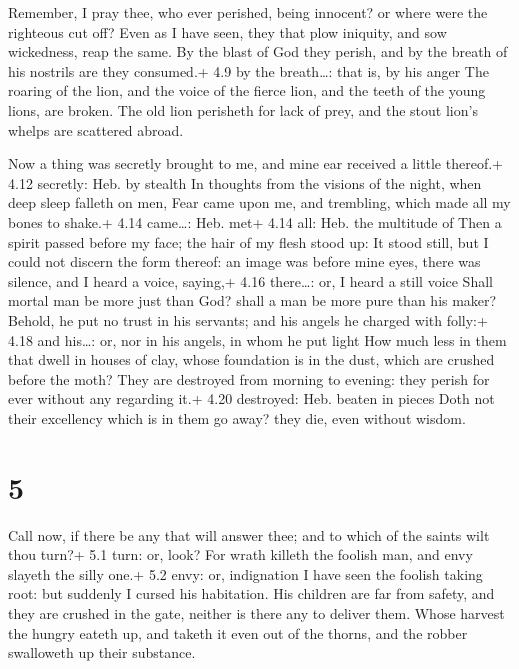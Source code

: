  Remember, I pray thee, who ever perished, being innocent?
or where were the righteous cut off?  Even as I have seen,
they that plow iniquity, and sow wickedness, reap the same. 
By the blast of God they perish, and by the breath of his nostrils are
they consumed.+ 4.9 by the breath\ldots: that is, by his anger
 The roaring of the lion, and the voice of the fierce lion,
and the teeth of the young lions, are broken.  The old lion
perisheth for lack of prey, and the stout lion's whelps are scattered
abroad.

 Now a thing was secretly brought to me, and mine ear
received a little thereof.+ 4.12 secretly: Heb. by stealth 
In thoughts from the visions of the night, when deep sleep falleth on
men,  Fear came upon me, and trembling, which made all my
bones to shake.+ 4.14 came\ldots: Heb. met+ 4.14 all: Heb. the multitude
of  Then a spirit passed before my face; the hair of my
flesh stood up:  It stood still, but I could not discern
the form thereof: an image was before mine eyes, there was silence, and
I heard a voice, saying,+ 4.16 there\ldots: or, I heard a still voice
 Shall mortal man be more just than God? shall a man be
more pure than his maker?  Behold, he put no trust in his
servants; and his angels he charged with folly:+ 4.18 and his\ldots: or,
nor in his angels, in whom he put light  How much less in
them that dwell in houses of clay, whose foundation is in the dust,
which are crushed before the moth?  They are destroyed from
morning to evening: they perish for ever without any regarding it.+ 4.20
destroyed: Heb. beaten in pieces  Doth not their excellency
which is in them go away? they die, even without wisdom.

\hypertarget{section-4}{%
\section{5}\label{section-4}}

 Call now, if there be any that will answer thee; and to
which of the saints wilt thou turn?+ 5.1 turn: or, look? 
For wrath killeth the foolish man, and envy slayeth the silly one.+ 5.2
envy: or, indignation  I have seen the foolish taking root:
but suddenly I cursed his habitation.  His children are far
from safety, and they are crushed in the gate, neither is there any to
deliver them.  Whose harvest the hungry eateth up, and
taketh it even out of the thorns, and the robber swalloweth up their
substance.


